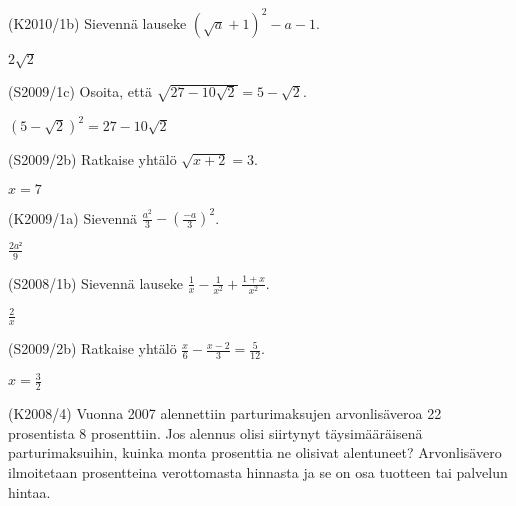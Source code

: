\begin{tehtava}(K2010/1b) Sievennä lauseke $ (\sqrt{a} + 1)^2 - a - 1 $.
\begin{vastaus}
				$2\sqrt{2}$
				\end{vastaus}
\end{tehtava}

\begin{tehtava}(S2009/1c) Osoita, että $\sqrt{27 - 10 \sqrt{2}} = 5 - \sqrt{2} $.
\begin{vastaus}
				$(5-\sqrt{2})^2=27-10\sqrt{2}$ %
				\end{vastaus}
\end{tehtava}

\begin{tehtava}(S2009/2b)  Ratkaise yhtälö $ \sqrt{x + 2 } = 3$.
\begin{vastaus}
				$x=7$
				\end{vastaus}
\end{tehtava}

\begin{tehtava}(K2009/1a)  Sievennä $ \frac{a^2}{3} - \left( \frac{-a}{3} \right)^2 $.
\begin{vastaus}
				$\frac{2a²}{9}$
				\end{vastaus}
\end{tehtava}

\begin{tehtava}(S2008/1b)  Sievennä lauseke $\frac{1}{x} - \frac{1}{x^2} + \frac{1 + x}{x^2}$.
                        \begin{vastaus}
				$\frac{2}{x}$
				\end{vastaus}
\end{tehtava}

\begin{tehtava}(S2009/2b)  Ratkaise yhtälö $\frac{x}{6} - \frac{x - 2}{3} = \frac{5}{12}$.
                        \begin{vastaus}
				$x=\frac{3}{2}$
				\end{vastaus}
\end{tehtava}

\begin{tehtava}(K2008/4) Vuonna 2007 alennettiin parturimaksujen arvonlisäveroa 22 prosentista 8 prosenttiin. Jos alennus olisi siirtynyt täysimääräisenä parturimaksuihin, kuinka monta prosenttia ne olisivat alentuneet? Arvonlisävero ilmoitetaan prosentteina verottomasta hinnasta ja se on osa tuotteen tai palvelun hintaa.
\end{tehtava}

